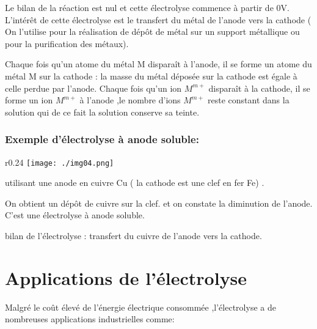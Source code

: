 \documentclass[12pt]{article}
\begin{document}
Le bilan de la réaction est nul et cette électrolyse commence à partir de 0V.
L’intérêt de cette électrolyse est le transfert du métal de l'anode vers la cathode ( On l’utilise pour la réalisation de dépôt de
métal sur un support métallique ou pour la purification des métaux).

Chaque fois qu’un atome du métal M disparaît à l’anode, il se forme un atome du métal M sur la cathode : la masse
du métal déposée sur la cathode est égale à celle perdue par l’anode.
Chaque fois qu’un ion $M^{m+}$ disparaît à la cathode, il se forme un ion $M^{m+}$ à l’anode ,le nombre d’ions $M^{m+}$ reste
constant dans la solution qui de ce fait la solution conserve sa teinte.



\subsubsection{Exemple d'électrolyse à anode soluble:}
\begin{wrapfigure}[3]{r}{0.24\textwidth}
	\texttt{[image: ./img04.png]}
\end{wrapfigure}
utilisant une anode en cuivre Cu ( la cathode est une clef en fer Fe) .


On obtient un dépôt de cuivre sur la clef. et on constate la diminution de l'anode. C'est une électrolyse à anode soluble. 



bilan de l'électrolyse : transfert du cuivre de l'anode vers la cathode.


\section{Applications de l'électrolyse}

Malgré le coût élevé de l'énergie électrique consommée ,l'électrolyse a de nombreuses applications industrielles comme:
\end{document}
